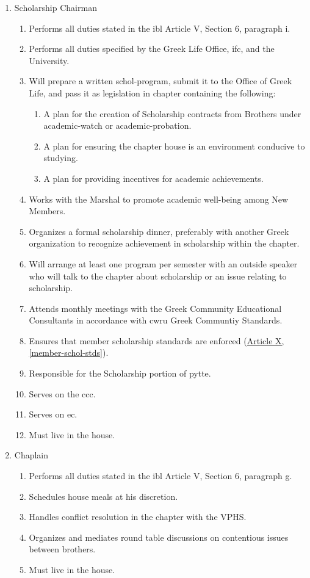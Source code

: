 \begin{enumerate}
		\item Scholarship Chairman \label{schol-chair-duties}
			\begin{enumerate}
				\item Performs all duties stated in the \gls{ibl} Article V, Section 6, paragraph i.
				\item Performs all duties specified by the Greek Life Office, \gls{ifc}, and the University.
				\item Will prepare a written \Gls{schol-program}, submit it to the Office of Greek Life, and pass it as legislation in chapter containing the following:
				\begin{enumerate}
					\item A plan for the creation of Scholarship contracts from Brothers under \gls{academic-watch} or \gls{academic-probation}.
					\item A plan for ensuring the chapter house is an environment conducive to studying.
					\item A plan for providing incentives for academic achievements.
				\end{enumerate}
				\item Works with the Marshal to promote academic well-being among New Members.
                \item Organizes a formal scholarship dinner, preferably with another Greek organization to recognize achievement in scholarship within the chapter.
				\item Will arrange at least one program per semester with an outside speaker who will talk to the chapter about scholarship or an issue relating to scholarship.
				\item Attends monthly meetings with the Greek Community Educational Consultants in accordance with \gls{cwru} Greek Communtiy Standards.
				\item Ensures that member scholarship standards are enforced (\hyperref[member-schol-stds]{Article X, \autoref*{member-schol-stds}}).
				\item Responsible for the Scholarship portion of \gls{pytte}.
                \item Serves on the \gls{ccc}.
                \item Serves on \gls{ec}.
                \item Must live in the house.
			\end{enumerate}
	

		\item Chaplain
			\begin{enumerate}
				\item Performs all duties stated in the \gls{ibl} Article V, Section 6, paragraph g.
				\item Schedules house meals at his discretion.
				\item Handles conflict resolution in the chapter with the VPHS.
				\item Organizes and mediates round table discussions on contentious issues between brothers.
				\item Must live in the house.
			\end{enumerate}


\end{enumerate}
